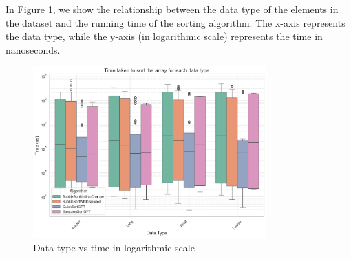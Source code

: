 \documentclass[unicode,11pt,a4paper,oneside,numbers=endperiod,openany]{scrartcl}
\begin{document}
    In Figure \ref{fig:hip3}, we show the relationship between the data type of the elements in the dataset and the running time of the sorting algorithm. The x-axis represents the data type, while the y-axis (in logarithmic scale) represents the time in nanoseconds.\\
\hfill
        \begin{figure}[htbp]
            \centering
            \includegraphics[width=0.8\textwidth]{./fig/hip3.png}
            \caption{Data type vs time in logarithmic scale}
            \label{fig:hip3}
        \end{figure}
\end{document}
